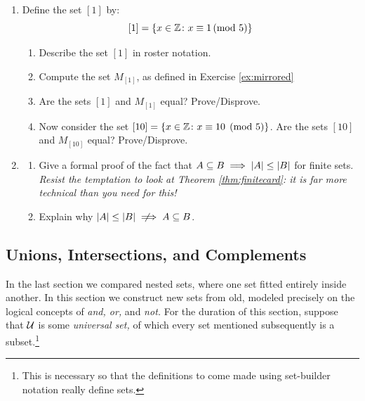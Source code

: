 \begin{exercises}{}{}
\begin{enumerate}
  \item Define the set $ [1] $ by:
	\[[1]=\{x\in\mathbb{Z}\colon x\equiv 1\negthickspace\pmod{5}\}\]
		\begin{enumerate}
		  \item Describe the set $[1]$ in roster notation.
		  \item Compute the set $M_{[1]}$, as defined in Exercise \ref{ex:mirrored}
			\item Are the sets $[1]$ and $M_{[1]}$ equal? Prove/Disprove.
			\item Now consider the set $[10]=\{x\in\mathbb{Z}\colon x\equiv 10 \pmod 5\}$. Are the sets $[10]$ and $M_{[10]}$ equal? Prove/Disprove.
  	\end{enumerate}
  	
	\item\begin{enumerate}
	  \item Give a formal proof of the fact that $A\subseteq B\implies \left| A\right|\le\left| B\right|$ for finite sets. \emph{Resist the temptation to look at Theorem \ref{thm:finitecard}: it is far more technical than you need for this!}
	  \item Explain why $\nm A\le \nm B\notimplies A\subseteq B$.
  	\end{enumerate}
\end{enumerate}

\end{exercises}
\clearpage


\subsection{Unions, Intersections, and Complements}

In the last section we compared nested sets, where one set fitted entirely inside another. In this section we construct new sets from old, modeled precisely on the logical concepts of \emph{and, or,} and \emph{not.}
For the duration of this section, suppose that $\mathcal{U}$ is some \emph{universal set,} of which every set mentioned subsequently is a subset.\footnote{This is necessary so that the definitions to come made using set-builder notation really define sets.}\par


